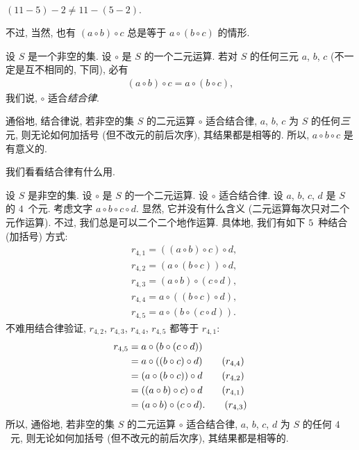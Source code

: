 \begin{example}
    \(
    (11 - 5) - 2 \neq 11 - (5 - 2).
    \)
\end{example}

不过, 当然, 也有 \((a \circ b) \circ c\)
总是等于 \(a \circ (b \circ c)\)
的情形.

\begin{definition}
    设 \(S\) 是一个非空的集.
    设 \(\circ\) 是 \(S\) 的一个二元运算.
    若对 \(S\) 的任何三元 \(a\), \(b\), \(c\)
    (不一定是互不相同的, 下同),
    必有
    \begin{align*}
        (a \circ b) \circ c = a \circ (b \circ c),
    \end{align*}
    我们说, \(\circ\) 适合\emph{结合律}.
\end{definition}

通俗地, 结合律说,
若非空的集 \(S\) 的二元运算 \(\circ\) 适合结合律,
\(a\), \(b\), \(c\) 为 \(S\) 的任何\emph{三}元,
则无论如何加括号
(但不改元的前后次序),
其结果都是相等的.
所以, \(a \circ b \circ c\) 是有意义的.

我们看看结合律有什么用.

设 \(S\) 是非空的集.
设 \(\circ\) 是 \(S\) 的一个二元运算.
设 \(\circ\) 适合结合律.
设 \(a\), \(b\), \(c\), \(d\) 是 \(S\) 的 \(4\)~个元.
考虑文字 \(a \circ b \circ c \circ d\).
显然, 它并没有什么含义
(二元运算每次只对二个元作运算).
不过, 我们总是可以二个二个地作运算.
具体地, 我们有如下 \(5\)~种结合 (加括号) 方式:
\begin{align*}
     & r_{4,1} = ((a \circ b) \circ c) \circ d, \\
     & r_{4,2} = (a \circ (b \circ c)) \circ d, \\
     & r_{4,3} = (a \circ b) \circ (c \circ d), \\
     & r_{4,4} = a \circ ((b \circ c) \circ d), \\
     & r_{4,5} = a \circ (b \circ (c \circ d)).
\end{align*}
不难用结合律验证,
\(r_{4,2}\), \(r_{4,3}\), \(r_{4,4}\), \(r_{4,5}\)
都等于 \(r_{4,1}\):
\begin{align*}
    r_{4,5}
    = {} & a \circ (b \circ (c \circ d))
    \\
    = {} & a \circ ((b \circ c) \circ d)
    \tag*{(\(r_{4,4}\))}                  \\
    = {} & (a \circ (b \circ c)) \circ d
    \tag*{(\(r_{4,2}\))}                  \\
    = {} & ((a \circ b) \circ c) \circ d
    \tag*{(\(r_{4,1}\))}                  \\
    = {} & (a \circ b) \circ (c \circ d).
    \tag*{(\(r_{4,3}\))}
\end{align*}
所以, 通俗地,
若非空的集 \(S\) 的二元运算 \(\circ\) 适合结合律,
\(a\), \(b\), \(c\), \(d\) 为 \(S\) 的任何 \(4\)~元,
则无论如何加括号
(但不改元的前后次序),
其结果都是相等的.

